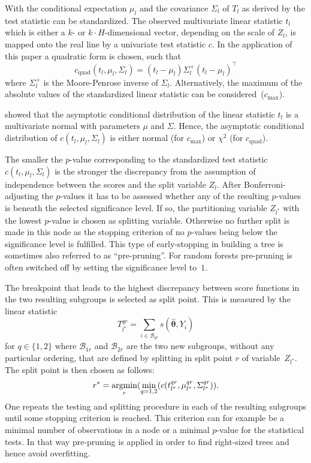 \documentclass[aoas, preprint]{imsart}
\newcommand{\argmin}{\operatorname{argmin}\displaylimits}
\numberwithin{equation}{subsection}
\begin{document}
\begin{appendix}
With the conditional expectation $\mu_l$ and the covariance 
$\Sigma_l$ of $T_l$ as derived by 
\cite{Strasser+Weber:1999} the test statistic can be standardized. 
The observed multivariate linear statistic $t_l$ which is either a
$k$- or $k \cdot H$-dimensional vector, depending on the scale of $Z_l$,
is mapped onto the real line by a univariate test statistic $c$.
In the application of this paper a quadratic form is chosen, such that
\begin{equation}
c_{\text{quad}}(t_l,\mu_l,\Sigma_l) = (t_l-\mu_l)\Sigma_l^+(t_l-\mu_l)^{\top}
\end{equation}
where $\Sigma_l^+$ is the Moore-Penrose inverse of $\Sigma_l$. Alternatively,
the maximum of the absolute values of the standardized linear statistic
can be considered~($c_{\text{max}}$).

\cite{Strasser+Weber:1999} showed that the asymptotic conditional 
distribution of the linear statistic $t_l$ is a multivariate normal with parameters
$\mu$ and $\Sigma$. Hence, the asymptotic conditional distribution of
$c(t_{l},\mu_{l},\Sigma_{l})$ 
is either normal
(for $c_{\text{max}}$) 
or 
$\chi^2$ (for $c_{\text{quad}}$).

The smaller the $p$-value corresponding to the standardized test 
statistic $c(t_{l},\mu_{l},\Sigma_{l})$ is the stronger the discrepancy 
from the assumption of independence between the scores and the split 
variable $Z_l$.
%
After Bonferroni-adjusting the $p$-values it has to be assessed whether
any of the resulting $p$-values is beneath the selected significance level. 
If so, the partitioning variable $Z_{l^\ast}$ with the lowest $p$-value 
is chosen as splitting variable. Otherwise no further split is made 
in this node as the stopping criterion of no $p$-values being below the 
significance level is fulfilled. This type of early-stopping in building
a tree is sometimes also referred to as ``pre-pruning''. For random forests
pre-pruning is often switched off by setting the significance level to~$1$.

The breakpoint that leads to the highest discrepancy between score functions 
in the two resulting subgroups is selected as split point. 
This is measured by the linear statistic
\begin{equation}
T_{l^{\ast}}^{qr} = \sum_{i \in \mathcal{B}_{qr}} s(\bm{\hat{\theta}}, Y_i)
\end{equation}
for $q \in \{1,2\}$ where $\mathcal{B}_{1r}$ and $\mathcal{B}_{2r}$ are the 
two new subgroups, without any particular ordering, that are defined by 
splitting in split point $r$ of variable~$Z_{l^{\ast}}$.
The split point is then chosen as follows:
\begin{equation}
r^{\ast} = \argmin_{r} (\min_{q=1,2}(c(t_{l^{\ast}}^{qr},\mu_{l^{\ast}}^{qr},\Sigma_{l^{\ast}}^{qr})).
\end{equation}
One repeats the testing and splitting procedure in each of the resulting 
subgroups until some stopping criterion is reached. This criterion 
can for example be a minimal number of observations in a node or a 
minimal $p$-value for the statistical tests. In that way pre-pruning
is applied in order to find right-sized trees and hence 
avoid overfitting.


\end{appendix}
\end{document}
